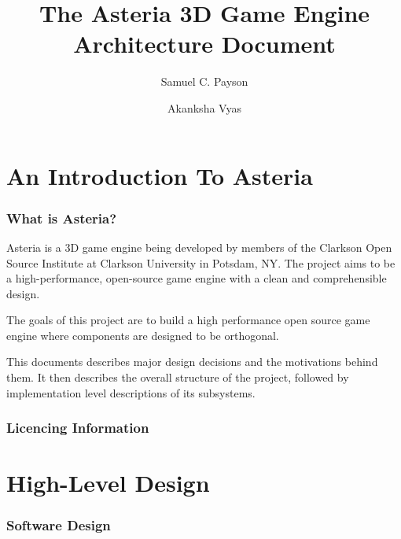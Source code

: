 \documentclass[10pt]{article}
\title{\textbf{The Asteria 3D Game Engine} \\ \textbf{\small Architecture Document } }
\author{Samuel C. Payson \and Akanksha Vyas}
\begin{document}
\maketitle

\begin{center}
   \begin{tikzpicture}
      
   \end{tikzpicture}
\end{center}

\thispagestyle{empty}
\pagebreak
{}
\setcounter{page}{1}
\tableofcontents

\pagebreak
{}
\setcounter{page}{1}

\part*{An Introduction To Asteria}

\section{What is Asteria?}
Asteria is a 3D game engine being developed by members of the Clarkson Open
Source Institute at Clarkson University in Potsdam, NY. The project aims to be
a high-performance, open-source game engine with a clean and comprehensible
design.

The goals of this project are to build a high performance open source game
engine where components are designed to be orthogonal.

This documents describes major design decisions and the motivations behind them.
It then describes the overall structure of the project, followed by
implementation level descriptions of its subsystems.

\section{Licencing Information}

\pagebreak

\part*{High-Level Design}

\section{Software Design}
\end{document}
